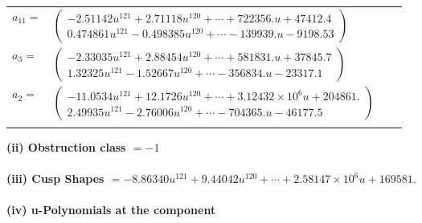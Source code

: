 \documentclass[1p]{elsarticle_modified}
\theoremstyle{definition}
\begin{document}
\begin{tabular}{m{7pt} m{180pt} m{7pt} m{180pt} }
\flushright $a_{11}=$&$\begin{pmatrix}-2.51142 u^{121}+2.71118 u^{120}+\cdots+722356. u+47412.4\\0.474861 u^{121}-0.498385 u^{120}+\cdots-139939. u-9198.53\end{pmatrix}$ \\
\flushright $a_{3}=$&$\begin{pmatrix}-2.33035 u^{121}+2.88454 u^{120}+\cdots+581831. u+37845.7\\1.32325 u^{121}-1.52667 u^{120}+\cdots-356834. u-23317.1\end{pmatrix}$ \\
\flushright $a_{2}=$&$\begin{pmatrix}-11.0534 u^{121}+12.1726 u^{120}+\cdots+3.12432\times10^{6} u+204861.\\2.49935 u^{121}-2.76006 u^{120}+\cdots-704365. u-46177.5\end{pmatrix}$\\&\end{tabular}
\flushleft \textbf{(ii) Obstruction class $= -1$}\\~\\
\flushleft \textbf{(iii) Cusp Shapes $= -8.86340 u^{121}+9.44042 u^{120}+\cdots+2.58147\times10^{6} u+169581.$}\\~\\
\newpage\renewcommand{\arraystretch}{1}
\flushleft \textbf{(iv) u-Polynomials at the component}\newline \\
\end{document}
